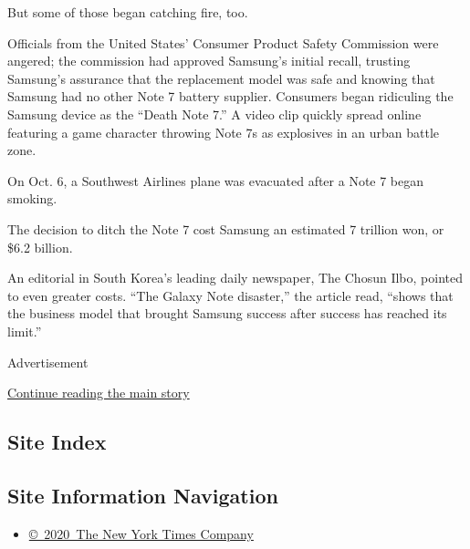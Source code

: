 But some of those began catching fire, too.

Officials from the United States' Consumer Product Safety Commission
were angered; the commission had approved Samsung's initial recall,
trusting Samsung's assurance that the replacement model was safe and
knowing that Samsung had no other Note 7 battery supplier. Consumers
began ridiculing the Samsung device as the ``Death Note 7.'' A video
clip quickly spread online featuring a game character throwing Note 7s
as explosives in an urban battle zone.

On Oct. 6, a Southwest Airlines plane was evacuated after a Note 7 began
smoking.

The decision to ditch the Note 7 cost Samsung an estimated 7 trillion
won, or \$6.2 billion.

An editorial in South Korea's leading daily newspaper, The Chosun Ilbo,
pointed to even greater costs. ``The Galaxy Note disaster,'' the article
read, ``shows that the business model that brought Samsung success after
success has reached its limit.''

Advertisement

\protect\hyperlink{after-bottom}{Continue reading the main story}

\hypertarget{site-index}{%
\subsection{Site Index}\label{site-index}}

\hypertarget{site-information-navigation}{%
\subsection{Site Information
Navigation}\label{site-information-navigation}}

\begin{itemize}
\tightlist
\item
  \href{https://help.nytimes3xbfgragh.onion/hc/en-us/articles/115014792127-Copyright-notice}{©~2020~The
  New York Times Company}
\end{itemize}

